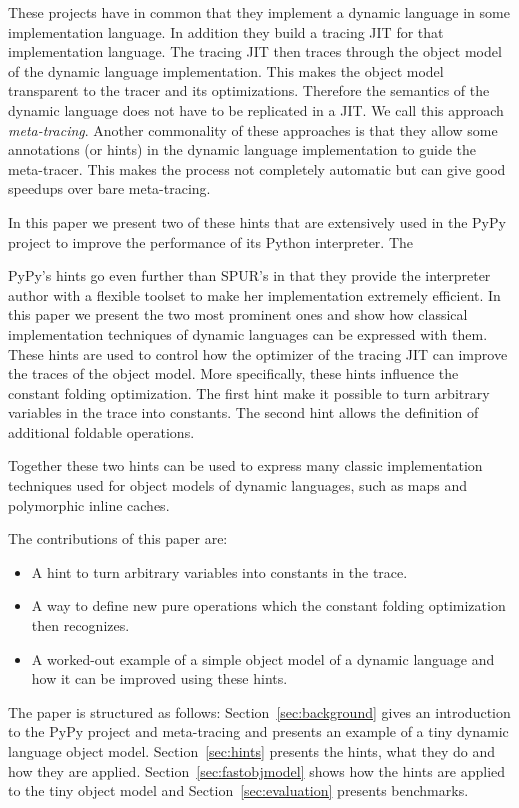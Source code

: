\documentclass{sigplanconf}
\begin{document}
These projects have in common that they implement a dynamic language in some
implementation language. In addition they build a tracing JIT for that implementation
language. The tracing JIT then traces through the object model of the dynamic
language implementation. This makes the object model transparent to the tracer
and its optimizations. Therefore the semantics of the dynamic language does not
have to be replicated in a JIT. We call this approach \emph{meta-tracing}.
Another commonality of these approaches is that they allow some annotations (or
hints) in the dynamic language implementation to guide the meta-tracer. This
makes the process not completely automatic but can give good speedups over
bare meta-tracing.

In this paper we present two of these hints that are extensively used in the
PyPy project to improve the performance of its Python interpreter.
 The 

PyPy's hints go even further than SPUR's in that they provide the interpreter
author with a flexible toolset to make her implementation extremely efficient.
In this paper we present the two most prominent ones and show how classical
implementation techniques of dynamic languages can be expressed with them. These
hints are used to control how the optimizer of the tracing JIT can improve the
traces of the object model. More specifically, these hints influence the
constant folding optimization. The first hint make it possible to turn arbitrary
variables in the trace into constants. The second hint allows the definition of
additional foldable operations.

Together these two hints can be used to express many classic implementation
techniques used for object models of dynamic languages, such as maps and
polymorphic inline caches.

The contributions of this paper are:
\begin{itemize}
 \item A hint to turn arbitrary variables into constants in the trace.
 \item A way to define new pure operations which the constant folding
 optimization then recognizes.
 \item A worked-out example of a simple object model of a dynamic language and
 how it can be improved using these hints.
\end{itemize}

The paper is structured as follows: Section~\ref{sec:background} gives an
introduction to the PyPy project and meta-tracing and presents an example of a
tiny dynamic language object model. Section~\ref{sec:hints} presents the hints,
what they do and how they are applied. Section~\ref{sec:fastobjmodel} shows how
the hints are applied to the tiny object model and Section~\ref{sec:evaluation}
presents benchmarks.
\end{document}
